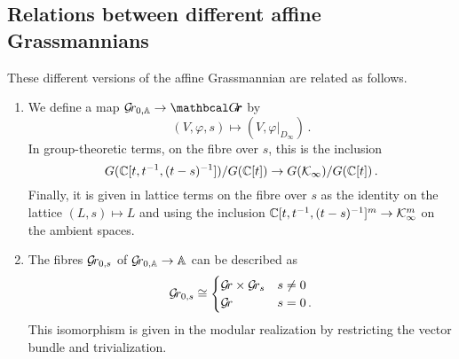 \documentclass[draft]{article}
\begin{document}
\subsection{Relations between different affine Grassmannians}
These different versions of the affine Grassmannian are related as follows.  

\begin{enumerate}
    \item 
    We define a map $ \Grbd \rightarrow \Grth $ by 
    $$
    (V,\varphi,s)\mapsto (V, \varphi \big|_{D_\infty})\,.
    $$
    In group-theoretic terms, on the fibre over $ s $, this is the inclusion
    $$
    G(\mathbb C[t, t^{-1}, (t-s)^{-1}])/ G(\mathbb C[t]) \rightarrow G(\mathcal K_\infty)/G(\mathbb C[t])\,. 
    $$
    Finally, it is given in lattice terms on the fibre over $s$ as the identity on the lattice $(L,s)\mapsto L$ and using the inclusion $\mathbb C[t, t^{-1}, (t-s)^{-1}]^m \rightarrow \mathcal K_\infty^m$ on the ambient spaces.
    \item The fibres $ \mathcal{G}\!r_{0,s}$ of $ {\mathcal{G}\!r_{0,\mathbb A}} \rightarrow \mathbb A$ can be described as %
    \begin{equation*}
    \mathcal{G}\!r_{0,s} \cong 
    \begin{cases} 
        \mathcal{G}\!r \times \mathcal{G}\!r_s & s \ne 0 \\
        \mathcal{G}\!r              & s = 0\,.
    \end{cases}
    \end{equation*}
    This isomorphism is given in the modular realization by restricting the vector bundle and trivialization.    
    

\end{enumerate}
\end{document}
